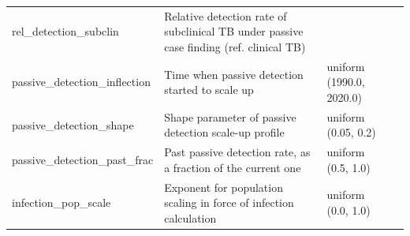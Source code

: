 \begin{longtable}{>{\ttfamily}p{} p{} >{\ttfamily}p{} l}
 rel\_detection\_subclin & Relative detection rate of subclinical TB under passive case finding (ref. clinical TB) & 0.0 &  \\
 passive\_detection\_inflection & Time when passive detection started to scale up & uniform (1990.0, 2020.0) &  \\
 passive\_detection\_shape & Shape parameter of passive detection scale-up profile & uniform (0.05, 0.2) &  \\
 passive\_detection\_past\_frac & Past passive detection rate, as a fraction of the current one & uniform (0.5, 1.0) &  \\
 infection\_pop\_scale & Exponent for population scaling in force of infection calculation & uniform (0.0, 1.0) &  \\
\end{longtable}
